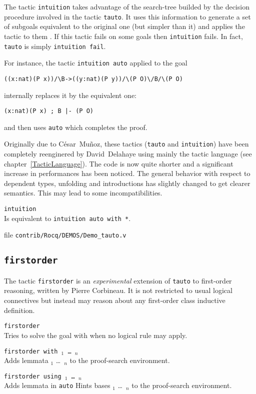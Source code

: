 The tactic \texttt{intuition} takes advantage of the search-tree builded
by the decision procedure involved in the tactic {\tt tauto}. It uses
this information to generate a set of subgoals equivalent to the
original one (but simpler than it) and applies the tactic 
{\tac} to them \cite{Mun94}. If this tactic fails on some goals then
{\tt intuition} fails. In fact, {\tt tauto} is simply {\tt intuition
  fail}.

For instance, the tactic {\tt intuition auto} applied to the goal
\begin{verbatim}
((x:nat)(P x))/\B->((y:nat)(P y))/\(P O)\/B/\(P O)
\end{verbatim}
internally replaces it by the equivalent one:
\begin{verbatim}
(x:nat)(P x) ; B |- (P O)
\end{verbatim}
and then uses {\tt auto} which completes the proof.

Originally due to C{\'e}sar~Mu{\~n}oz, these tactics ({\tt tauto} and {\tt intuition})
have been completely reenginered by David~Delahaye using mainly the tactic
language (see chapter~\ref{TacticLanguage}). The code is now quite shorter and
a significant increase in performances has been noticed. The general behavior
with respect to dependent types, unfolding and introductions has
slightly changed to get clearer semantics. This may lead to some
incompatibilities.

\begin{Variants}
\item {\tt intuition}\\
  Is equivalent to {\tt intuition auto with *}.
\end{Variants}

\SeeAlso file \texttt{contrib/Rocq/DEMOS/Demo\_tauto.v}

\subsection{{\tt firstorder}}
\label{firstorder}

The tactic \texttt{firstorder} is an {\it experimental} extension of
\texttt{tauto} to  
first-order reasoning, written by Pierre Corbineau. 
It is not restricted to usual logical connectives but
instead may reason about any first-order class inductive definition.

\begin{Variants}
 \item {\tt firstorder {\tac}}\\
   Tries to solve the goal with {\tac} when no logical rule may apply.
 \item {\tt firstorder with \ident$_1$ \dots\ \ident$_n$ }\\
   Adds lemmata \ident$_1$ \dots\ \ident$_n$ to the proof-search
   environment.
 \item {\tt firstorder using \ident$_1$ \dots\ \ident$_n$ }\\
   Adds lemmata in {\tt auto} Hints bases \ident$_1$ \dots\ \ident$_n$
   to the proof-search environment.
\end{Variants}

